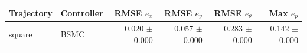 \begin{tabular}{llrrrr}
\hline
Trajectory & Controller & RMSE $e_x$ & RMSE $e_y$ & RMSE $e_\theta$ & Max $e_p$ \\
\hline
square & BSMC & 0.020 $\pm$ 0.000 & 0.057 $\pm$ 0.000 & 0.283 $\pm$ 0.000 & 0.142 $\pm$ 0.000 \\
\hline
\end{tabular}
